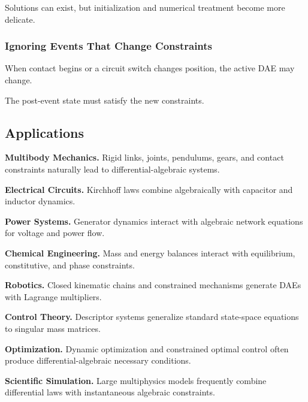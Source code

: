 Solutions can exist, but initialization and numerical treatment become
more delicate.

\subsubsection{Ignoring Events That Change Constraints}

When contact begins or a circuit switch changes position, the active DAE
may change.

The post-event state must satisfy the new constraints.

\subsection{Applications}
\label{subsec:dae-applications}

\begin{applicationbox}

\textbf{Multibody Mechanics.}
Rigid links, joints, pendulums, gears, and contact constraints naturally
lead to differential-algebraic systems.

\medskip

\textbf{Electrical Circuits.}
Kirchhoff laws combine algebraically with capacitor and inductor dynamics.

\medskip

\textbf{Power Systems.}
Generator dynamics interact with algebraic network equations for voltage
and power flow.

\medskip

\textbf{Chemical Engineering.}
Mass and energy balances interact with equilibrium, constitutive, and
phase constraints.

\medskip

\textbf{Robotics.}
Closed kinematic chains and constrained mechanisms generate DAEs with
Lagrange multipliers.

\medskip

\textbf{Control Theory.}
Descriptor systems generalize standard state-space equations to singular
mass matrices.

\medskip

\textbf{Optimization.}
Dynamic optimization and constrained optimal control often produce
differential-algebraic necessary conditions.

\medskip

\textbf{Scientific Simulation.}
Large multiphysics models frequently combine differential laws with
instantaneous algebraic constraints.

\end{applicationbox}


